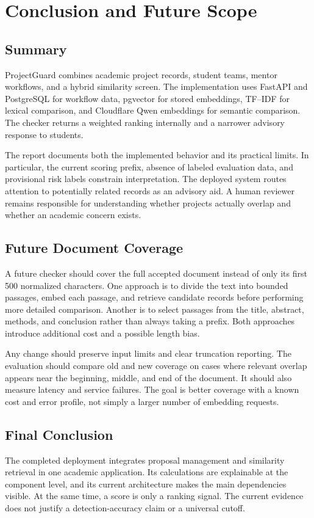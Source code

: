 \documentclass[12pt,a4paper]{report}
\begin{document}
\chapter{Conclusion and Future Scope}
\section{Summary}
ProjectGuard combines academic project records, student teams, mentor workflows, and a hybrid similarity screen. The implementation uses FastAPI and PostgreSQL for workflow data, pgvector for stored embeddings, TF--IDF for lexical comparison, and Cloudflare Qwen embeddings for semantic comparison. The checker returns a weighted ranking internally and a narrower advisory response to students.

The report documents both the implemented behavior and its practical limits. In particular, the current scoring prefix, absence of labeled evaluation data, and provisional risk labels constrain interpretation. The deployed system routes attention to potentially related records as an advisory aid. A human reviewer remains responsible for understanding whether projects actually overlap and whether an academic concern exists.


\section{Future Document Coverage}
A future checker should cover the full accepted document instead of only its first 500 normalized characters. One approach is to divide the text into bounded passages, embed each passage, and retrieve candidate records before performing more detailed comparison. Another is to select passages from the title, abstract, methods, and conclusion rather than always taking a prefix. Both approaches introduce additional cost and a possible length bias.

Any change should preserve input limits and clear truncation reporting. The evaluation should compare old and new coverage on cases where relevant overlap appears near the beginning, middle, and end of the document. It should also measure latency and service failures. The goal is better coverage with a known cost and error profile, not simply a larger number of embedding requests.

\section{Final Conclusion}
The completed deployment integrates proposal management and similarity retrieval in one academic application. Its calculations are explainable at the component level, and its current architecture makes the main dependencies visible. At the same time, a score is only a ranking signal. The current evidence does not justify a detection-accuracy claim or a universal cutoff.
\end{document}
